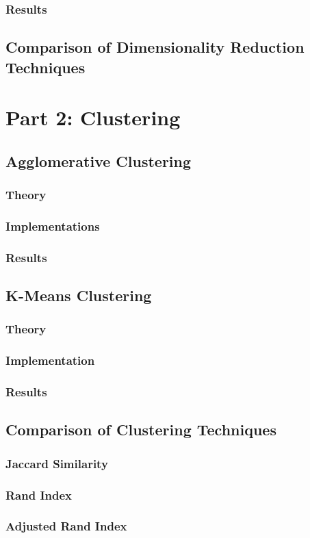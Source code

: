 \documentclass[12pt]{article}
\begin{document}
\subsubsection{Results}

\subsection{Comparison of Dimensionality Reduction Techniques}

\section{Part 2: Clustering}
\subsection{Agglomerative Clustering}
\subsubsection{Theory}

\subsubsection{Implementations}

\subsubsection{Results}

\subsection{K-Means Clustering}
\subsubsection{Theory}

\subsubsection{Implementation}

\subsubsection{Results}

\subsection{Comparison of Clustering Techniques}
\subsubsection{Jaccard Similarity}

\subsubsection{Rand Index}

\subsubsection{Adjusted Rand Index}
\end{document}
